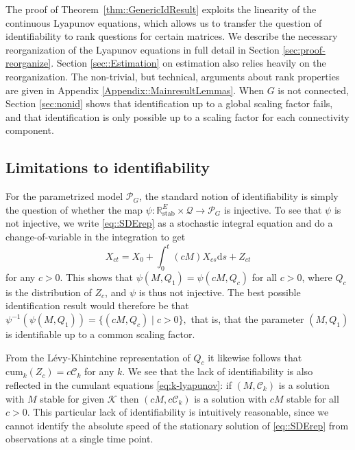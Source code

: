 \documentclass{biometrika}
\begin{document}
The proof of Theorem~\ref{thm::GenericIdResult} exploits the linearity of the continuous 
Lyapunov equations, which allows us to transfer 
the question of identifiability to rank questions for certain matrices. We describe the 
necessary reorganization of the Lyapunov equations in full detail in Section \ref{sec:proof-reorganize}. Section \ref{sec::Estimation} on estimation also relies heavily on the reorganization. 
The non-trivial, but technical, arguments about rank properties are given in 
Appendix \ref{Appendix::MainresultLemmas}. When $G$ is not connected, Section \ref{sec:nonid} shows 
that identification up to a global scaling factor fails, and that identification is only 
possible up to a scaling factor for each connectivity component.



\subsection{Limitations to identifiability}
\label{sec:lim}

For the parametrized model $\mathcal{P}_G$, the standard notion of identifiability is simply the 
question of whether the map $\psi : \mathbb{R}^{E}_{\mathrm{stab}} \times \mathcal{Q} \to \mathcal{P}_G$ is injective. To see that $\psi$ is not injective, we write \eqref{eq::SDErep} as a stochastic 
integral equation and do a change-of-variable in the integration to get 
$$
    X_{ct} = X_0 + \int_0^t (cM) X_{cs} \mathrm{d} s + Z_{ct}
$$
for any $c > 0$. This shows that $\psi(M, Q_1) = \psi(cM, Q_c)$ for all $c > 0$, where $Q_c$ is the distribution of $Z_c$, and $\psi$ is thus not injective. The best possible 
identification result would therefore be that 
$\psi^{-1}(\psi(M, Q_1)) = \{ (cM, Q_c) \mid c > 0 \},$
that is, that the parameter $(M, Q_1)$ is identifiable up to a common scaling factor. 

From the Lévy-Khintchine representation of $Q_c$ it likewise follows that 
$\mathrm{cum}_k(Z_{c}) = c \mathcal{C}_k$ for any $k$. We 
see that the lack of identifiability is also reflected in the cumulant equations 
\eqref{eq:k-lyapunov}: if $(M, \mathcal{C}_k)$ is a solution with $M$ stable for given $\mathcal{K}$ then
$(cM, c\mathcal{C}_k)$ is a solution with $cM$ stable for all $c > 0$. 
This particular lack of identifiability is intuitively reasonable, 
since we cannot identify the absolute speed of the stationary solution of 
\eqref{eq::SDErep} from observations at a single time point.
\end{document}
